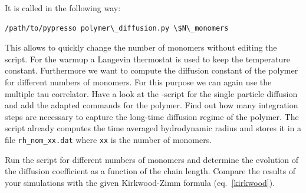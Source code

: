 It is called in the following way:
{\vspace{0,2cm}\small
\begin{lstlisting}[numbers=none]
/path/to/pypresso polymer\_diffusion.py \$N\_monomers  
\end{lstlisting}\vspace{0,2cm}
}
This allows to quickly change the number of monomers without editing 
the script.
For the warmup a Langevin thermostat is used to keep the temperature constant.
Furthermore we want to compute the diffusion constant of the polymer for
different numbers of monomers. For this purpose we can again use the multiple
tau correlator. Have a look at the \ES{} -script for the single particle diffusion
and add the adapted commands for the polymer. Find out how many integration steps are
necessary to capture the long-time diffusion regime of the polymer. The script
already computes the time averaged hydrodynamic radius and stores it in a file
\texttt{rh\_nom\_xx.dat} where \texttt{xx} is the number of monomers.

Run the script for different numbers of monomers and determine the evolution of
the diffusion coefficient as a function of the chain length. Compare the results
of your \ES{} simulations with the given Kirkwood-Zimm formula
(eq.~\ref{kirkwood}). 
